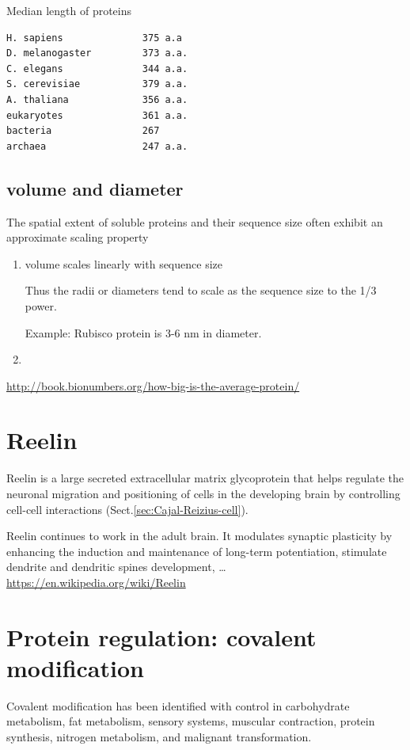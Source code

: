 Median length of proteins
\begin{verbatim}
H. sapiens				375 a.a
D. melanogaster			373 a.a.
C. elegans				344 a.a.
S. cerevisiae 			379 a.a.
A. thaliana				356 a.a.
eukaryotes				361 a.a.
bacteria				267
archaea 				247 a.a.
\end{verbatim}

\subsection{volume and diameter}

The spatial extent of soluble proteins and their sequence size often exhibit an
approximate scaling property 
\begin{enumerate}
  \item  volume scales linearly with sequence size  	
  
  Thus the radii or diameters tend to scale as the sequence size to the 1/3
  power.
 
 Example: Rubisco protein is  3-6 nm in diameter.
  
  \item 
\end{enumerate}

\url{http://book.bionumbers.org/how-big-is-the-average-protein/}

\section{Reelin}
\label{sec:reelin}


Reelin is a large secreted extracellular matrix glycoprotein that helps regulate
the neuronal migration and positioning of cells in the developing brain by
controlling cell-cell interactions (Sect.\ref{sec:Cajal-Reizius-cell}).

Reelin continues to work in the adult brain. It modulates synaptic plasticity by
enhancing the induction and maintenance of long-term potentiation, stimulate
dendrite and dendritic spines development, \ldots
\url{https://en.wikipedia.org/wiki/Reelin}

\section{Protein regulation: covalent modification}
\label{sec:protein-regulation}
\label{sec:covalent-modification}

Covalent modification has been identified with control in carbohydrate
metabolism, fat metabolism, sensory systems, muscular contraction, protein
synthesis, nitrogen metabolism, and malignant transformation.

